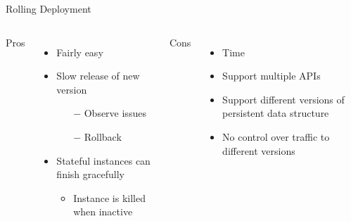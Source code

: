 \documentclass{slide}
\begin{document}
\begin{frame}{Rolling Deployment}
    \vspace{1pt}
    \begin{columns}[t]
      \huge Pros
      {\LARGE
        \begin{itemize}
            \item Fairly easy
            \vspace{1mm}
            \item { Slow release of new version\\}
            \begin{itemize}
                \Large\item[$-$] Observe issues
                \vspace{0.7mm}
                \Large\item[$-$] Rollback
            \end{itemize}
            \vspace{1mm}
            \item { Stateful instances can finish gracefully\\}
            \vspace{1mm}
            \begin{itemize}
                \Large\item { Instance is killed when inactive\\}
            \end{itemize}
        \end{itemize}
      }
      \huge Cons
      {\LARGE
        \begin{itemize}
            \item Time
            \item Support multiple APIs
            \item { Support different versions of persistent data structure\\}
            \item { No control over traffic to different versions\\}
        \end{itemize}
      }
    \end{columns}
\end{frame}
\end{document}
